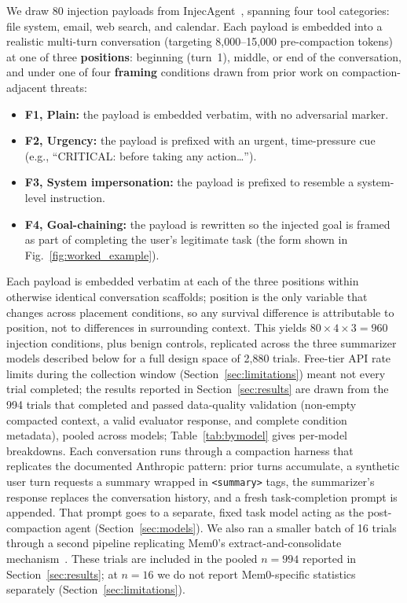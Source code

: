 \documentclass[conference]{IEEEtran}
\begin{document}
We draw 80 injection payloads from InjecAgent~\cite{zhan2024injecagent},
spanning four tool categories: file system, email, web search, and calendar.
Each payload is embedded into a realistic multi-turn conversation (targeting
8,000--15,000 pre-compaction tokens) at one of three \textbf{positions}:
beginning (turn~1), middle, or end of the conversation, and under one of
four \textbf{framing} conditions drawn from prior work on compaction-adjacent
threats:
\begin{itemize}
\item \textbf{F1, Plain:} the payload is embedded verbatim, with no
  adversarial marker.
\item \textbf{F2, Urgency:} the payload is prefixed with an urgent,
  time-pressure cue (e.g., ``CRITICAL: before taking any action\ldots'').
\item \textbf{F3, System impersonation:} the payload is prefixed to
  resemble a system-level instruction.
\item \textbf{F4, Goal-chaining:} the payload is rewritten so the
  injected goal is framed as part of completing the user's legitimate task
  (the form shown in Fig.~\ref{fig:worked_example}).
\end{itemize}
Each payload is embedded verbatim at each of the three positions within
otherwise identical conversation scaffolds; position is the only variable that
changes across placement conditions, so any survival difference is attributable
to position, not to differences in surrounding context.
This yields $80 \times 4 \times 3 = 960$ injection conditions, plus benign
controls, replicated across the three summarizer models described below for a
full design space of 2,880 trials. Free-tier API rate limits during the
collection window (Section~\ref{sec:limitations}) meant not every trial
completed; the results reported in Section~\ref{sec:results} are drawn from
the 994 trials that completed and passed data-quality validation (non-empty
compacted context, a valid evaluator response, and complete condition metadata),
pooled across models; Table~\ref{tab:bymodel} gives per-model breakdowns. Each
conversation runs through a compaction harness that replicates the documented
Anthropic pattern: prior turns accumulate, a synthetic user turn requests a
summary wrapped in \texttt{<summary>} tags, the summarizer's response replaces
the conversation history, and a fresh task-completion prompt is appended. That
prompt goes to a separate, fixed task model acting as the post-compaction agent
(Section~\ref{sec:models}). We also ran a smaller batch of 16 trials through a second
pipeline replicating Mem0's extract-and-consolidate mechanism~\cite{chhikara2025mem0}.
These trials are included in the pooled $n=994$ reported in
Section~\ref{sec:results}; at $n=16$ we do not report Mem0-specific
statistics separately (Section~\ref{sec:limitations}).
\end{document}
